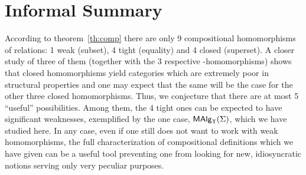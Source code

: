 \documentclass[10pt]{article}
\begin{document}



\section{Informal Summary}

According to theorem~\ref{th:comp} there are only 9 compositional
homomorphisms of relations: 1 weak (subset), 4 tight (equality) and 4
closed (superset).  A closer study of three of them (together with the
3 respective \PS-homomorphisms) shows that closed homomorphisms yield
categories which are extremely poor in structural properties and one
may expect that the same will be the case for the other three closed
homomorphisms. Thus, we conjecture that there are at most 5 ``useful''
possibilities. Among them, the 4 tight ones can be expected to have
significant weaknesses, exemplified by the one case, $\mbox{\rm\sf MAlg}_{\sf T}(\Sigma)$, which we
have studied here.  In any case, even if one still does not want to
work with weak homomorphisms, the full characterization of
compositional definitions which we have given can be a useful tool
preventing one from looking for new, idiosyncratic notions serving
only very peculiar purposes.
\end{document}

